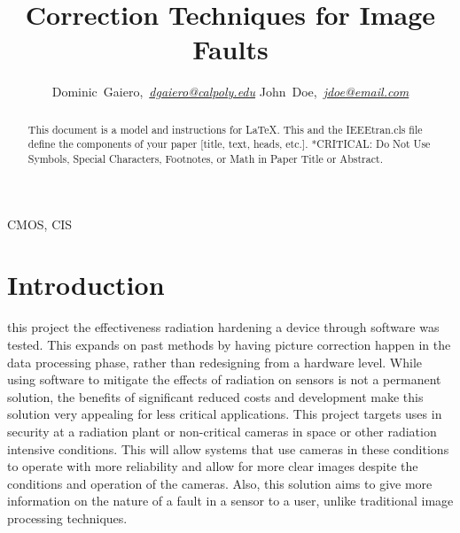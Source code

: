 \documentclass[journal]{IEEEtran}
\begin{document}
\title{Correction Techniques for Image Faults}


\author{Dominic~Gaiero,~\textit{\href{mailto:dgaiero@calpoly.edu}{dgaiero@calpoly.edu}}
        John~Doe,~\textit{\href{mailto:jdoe@email.com}{jdoe@email.com}}}

\maketitle
\begin{abstract}
This document is a model and instructions for \LaTeX.
This and the IEEEtran.cls file define the components of your paper [title, text, heads, etc.]. *CRITICAL: Do Not Use Symbols, Special Characters, Footnotes, 
or Math in Paper Title or Abstract.
\end{abstract}

\begin{IEEEkeywords}
CMOS, CIS
\end{IEEEkeywords}

\section{Introduction}%
 this project the effectiveness radiation hardening a device through software was tested.  This expands on past methods by having picture correction happen in the data processing phase, rather than redesigning from a hardware level. While using software to mitigate the effects of radiation on sensors is not a permanent solution, the benefits of significant reduced costs and development make this solution very appealing for less critical applications. This project targets uses in security at a radiation plant or non-critical cameras in space or other radiation intensive conditions. This will allow systems that use cameras in these conditions to operate with more reliability and allow for more clear images despite the conditions and operation of the cameras.  Also, this solution aims to give more information on the nature of a fault in a sensor to a user, unlike traditional image processing techniques.
\end{document}
